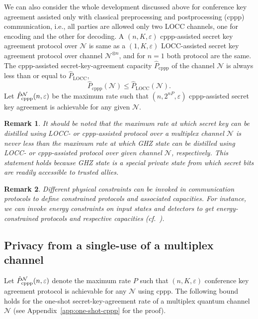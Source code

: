 \documentclass[aps,pra,twocolumn,superscriptaddress,longbibliography]{revtex4-1}
\def\LOCC{\operatorname{LOCC}}
\newcommand{\mc}[1]{\mathcal{#1}}
\newtheorem{remark}{Remark}
\begin{document}
We can also consider the whole development discussed above for conference key agreement assisted only with classical preprocessing and postprocessing (cppp) communication, i.e., all parties are allowed only two LOCC channels, one for encoding and the other for decoding. A $(n,K,\varepsilon)$ cppp-assisted secret key agreement protocol over $\mc{N}$ is same as a $(1,K,\varepsilon)$ LOCC-assisted secret key agreement protocol over channel $\mc{N}^{\otimes n}$, and for $n=1$ both protocol are the same. The cppp-assisted secret-key-agreement capacity $\hat{P}_{\text{cppp}}$ of the channel $\mc{N}$ is always less than or equal to $\hat{P}_{\LOCC}$,
\begin{equation}
\hat{P}_{\text{cppp}}(\mc{N})\leq \hat{P}_{\LOCC}(\mc{N}). 
\end{equation}
Let $
\hat{P}^{\mc{N}}_{\textnormal{cppp}}(n,\varepsilon)$ be the maximum rate such that $(n,2^{nP},\varepsilon)$ cppp-assisted secret key agreement is achievable for any given $\mc{N}$. 

\begin{remark} 
It should be noted that the maximum rate at which secret key can be distilled using LOCC- or cppp-assisted protocol over a multiplex channel $\mc{N}$ is never less than the maximum rate at which GHZ state can be distilled using LOCC- or cppp-assisted protocol over given channel $\mc{N}$, respectively. This statement holds because GHZ state is a special private state from which secret bits are readily accessible to trusted allies. 
\end{remark}

\begin{remark}
Different physical constraints can be invoked in communication protocols to define constrained protocols and associated capacities. For instance, we can invoke energy constraints on input states and detectors to get energy-constrained protocols and respective capacities (cf.~\cite{GES16,WQ18}).  
\end{remark}

\subsection{Privacy from a single-use of a multiplex channel}
Let $\hat{P}^{\mc{N}}_{\textnormal{cppp}}(n,\varepsilon)$ denote the maximum rate $P$ such that $(n,K,\varepsilon)$ conference key agreement protocol is achievable for any $\mc{N}$ using cppp. The following bound holds for the one-shot secret-key-agreement rate of a multiplex quantum channel $\mc{N}$ (see Appendix~\ref{app:one-shot-cppp} for the proof).  
\end{document}

